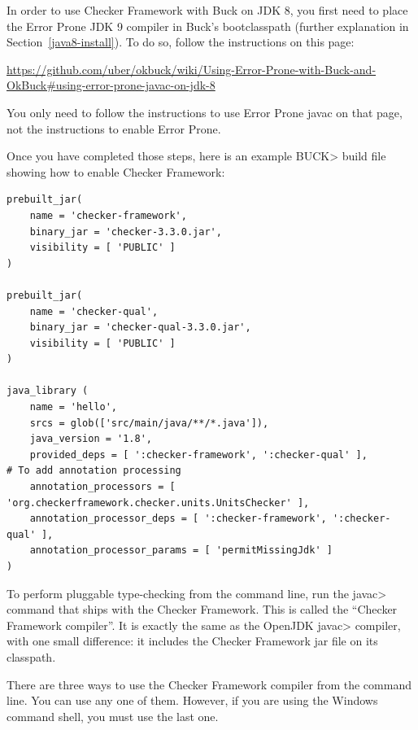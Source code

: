 In order to use Checker Framework with Buck on JDK 8, you first need
to place the Error Prone JDK 9 compiler in Buck's bootclasspath
(further explanation in Section~\ref{java8-install}).  To do so,
follow the instructions on this page:

{\codesize\url{https://github.com/uber/okbuck/wiki/Using-Error-Prone-with-Buck-and-OkBuck#using-error-prone-javac-on-jdk-8}}

You only need to follow the instructions to use Error Prone javac on
that page, not the instructions to enable Error Prone.

Once you have completed those steps, here is an example \<BUCK> build
file showing how to enable Checker Framework:

\begin{Verbatim}
prebuilt_jar(
    name = 'checker-framework',
    binary_jar = 'checker-3.3.0.jar',
    visibility = [ 'PUBLIC' ]
)

prebuilt_jar(
    name = 'checker-qual',
    binary_jar = 'checker-qual-3.3.0.jar',
    visibility = [ 'PUBLIC' ]
)

java_library (
    name = 'hello',
    srcs = glob(['src/main/java/**/*.java']),
    java_version = '1.8',
    provided_deps = [ ':checker-framework', ':checker-qual' ],
# To add annotation processing
    annotation_processors = [ 'org.checkerframework.checker.units.UnitsChecker' ],
    annotation_processor_deps = [ ':checker-framework', ':checker-qual' ],
    annotation_processor_params = [ 'permitMissingJdk' ]
)
\end{Verbatim}



\label{javac-installation}      %

To perform pluggable type-checking from the command line, run the \<javac>
command that ships with the Checker Framework.  This is called the
``Checker Framework compiler''.  It is exactly the same as the OpenJDK
\<javac> compiler, with one small difference:  it includes the Checker
Framework jar file on its classpath.

There are three ways to use the Checker Framework compiler from the command
line.  You can use any
one of them.  However, if you are using the Windows command shell, you must
use the last one.


